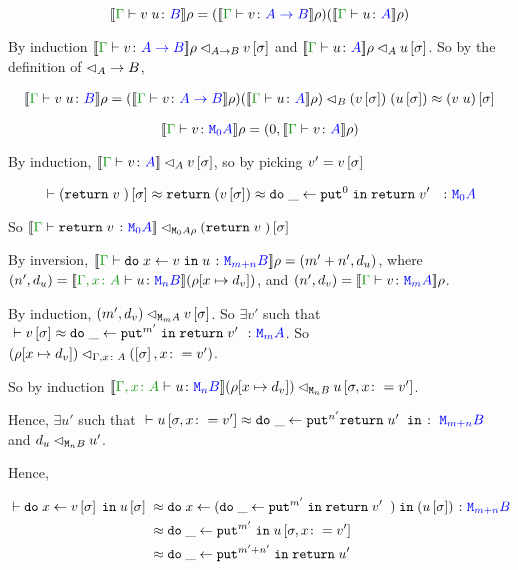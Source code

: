 \documentclass{Report}
\begin{document}
\case{\vapply}
\begin{equation}
    \deno{\gtyperelation{\apply{v}{u}}{B}}\rho = (\deno{\gtyperelation{v}{\ab}}\rho)(\deno{\gtyperelation{u}{A}}\rho)
\end{equation}

By induction $\logRel{\deno{\gtyperelation{v}{\ab}}\rho}{\ab}{v\ssi}$ and $\logRel{\deno{\gtyperelation{u}{A}}\rho}{A}{u\ssi}$. So by the definition of $\lhd_A\rightarrow B$, 

\begin{align}
    \deno{\gtyperelation{\apply{v}{u}}{B}}\rho =\logRel{(\deno{\gtyperelation{v}{\ab}}\rho)(\deno{\gtyperelation{u}{A}}\rho)}{B}{\apply{(v\ssi)}{(u\ssi)}\beequiv (\apply{v}{u})\ssi}
\end{align}

\case{\vreturn}

\begin{equation}
    \deno{\gtyperelation{v}{\M{0}{A}}}\rho = (0, \deno{\gtyperelation{v}{A}}\rho)
\end{equation}

By induction, $\logRel{\deno{\gtyperelation{v}{A}}}{A}{v\ssi}$, so by picking $v' = v\left[\sigma\right]$

\begin{equation}
    \zberelation{(\return{v})\ssi}{\return{(v\ssi)\beequiv \doin{\_}{\put^0}{\return{v'}}}}{\M{0}{A}}
\end{equation}

So $\logRel{\deno{\gtyperelation{\return{v}}{\M{0}{A}}}}{\M{0}{A}\rho}{(\return{v})\ssi}$

\case{\vbind}

By inversion, $\deno{\gtyperelation{\doin{x}{v}{u}}{\M{m+n}{B}}}\rho = (m'+n', d_u)$, where $(n', d_u) = \deno{\typerelation{\gax}{u}{\mnb}}(\rho[x\mapsto d_v])$, and $(n', d_v) = \deno{\gtyperelation{v}{\mma}}\rho$.

By induction, $(m', d_v) \lhd_{\texttt{M}_{m}{A}} v\left[\sigma\right]$. So $\exists v'$ such that $\zberelation{v\ssi}{\doin{\_}{\put^{m'}}{\return{v'}}}{\mma}$. So $(\rho[x\mapsto d_v]) \lhd_{\Gamma, x\colon A} (\left[\sigma\right], x\colon= v')$.

So by induction $\logRel{\deno{\typerelation{\gax}{u}{\mnb}}(\rho[x\mapsto d_v])}{\mnb}{u\sub{\si, x\setto v'}}$.

Hence, $\exists u'$ such that $\zberelation{u\sub{\si, x\setto v'}}{\doin{\_}{\put^{n'}{\return{u'}}}}{\M{m + n}{B}}$ and $d_u \lhd_{\texttt{M}_{n}{B}} u'$.

Hence,

\begin{align}
    \zberelation{\doin{x}{v\ssi}{u\ssi}&}{\doin{x}{(\doin{\_}{\put^{m'}}{\return{v'}})}{(u\ssi)}}{\M{m+n}{B}}\\
    &\beequiv\doin{\_}{\put^{m'}}{u\sub{\si, x\setto{v'}}}\\
    &\beequiv\doin{\_}{\put^{m'+n'}}{\return{u'}}
\end{align}
\end{document}
